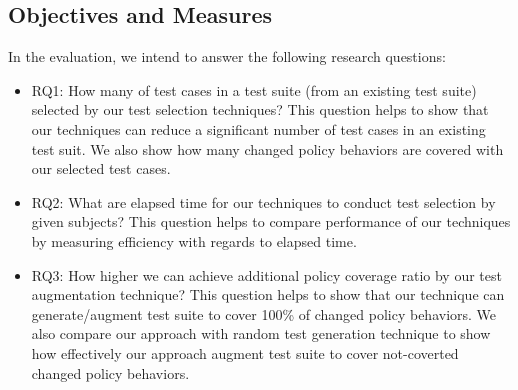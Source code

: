 \subsection{Objectives and Measures}
In the evaluation, we intend to answer the following research questions:
\begin{itemize}


	\item RQ1: How many of test cases in a test suite (from an existing test suite) selected by our test selection techniques? This question helps to show that our techniques can reduce a significant number of test cases in an existing test suit.
	We also show how many changed policy behaviors are covered with our selected test cases.
	
	
	\item RQ2: What are elapsed time for our techniques to conduct test selection by given subjects? This question helps to compare performance of our techniques by measuring efficiency with regards to elapsed time.
			
	\item RQ3: How higher we can achieve additional policy coverage ratio by our test augmentation technique?  This question helps to show that our technique can generate/augment test suite to cover 100\% of changed policy behaviors. We also compare our approach with random test generation technique to show how effectively our approach augment test suite to cover not-coverted changed policy behaviors.
				
\end{itemize}

%




